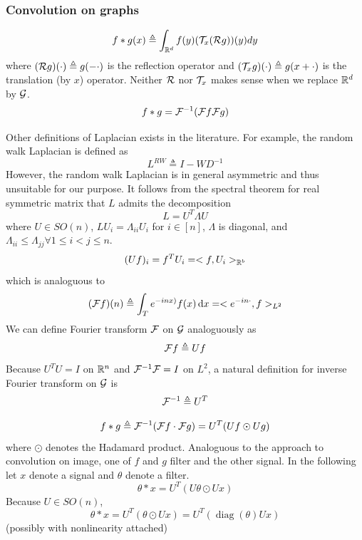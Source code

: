 \documentclass{article}
\DeclareMathOperator{\diag}{diag}
\begin{document}
\subsubsection{Convolution on graphs}

\begin{equation*}
f * g (x) \triangleq \int_{{\mathbb R}^d} f(y) ({\mathcal T}_x ({\mathcal R} g)) (y) dy
\end{equation*}
where $({\mathcal R} g) (\cdot) \triangleq g(-\cdot)$ is the reflection operator and $({\mathcal T}_x g) (\cdot) \triangleq g(x + \cdot)$ is the translation (by $x$) operator.
Neither ${\mathcal R}$ nor ${\mathcal T}_x$ makes sense when we replace ${\mathbb R}^d$ by ${\mathcal G}$.
\begin{equation*}
f * g = {\mathcal F}^{-1} ({\mathcal F}  f {\mathcal F} g)
\end{equation*}

Other definitions of Laplacian exists in the literature.
For example, the random walk Laplacian is defined as
\[
L^{RW} \triangleq I - W D^{-1}
\]
However, the random walk Laplacian is in general asymmetric and thus unsuitable for our purpose.
It follows from the spectral theorem for real symmetric matrix that $L$ admits the decomposition
\begin{equation*}
L = U^T \Lambda U
\end{equation*}
where $U \in SO(n)$, $L U_i = \Lambda_{i i} U_i$ for $i \in [n]$, $\Lambda$ is diagonal, and $\Lambda_{i i} \leq \Lambda_{j j} \forall 1 \leq i < j \leq n$.
\begin{equation*}
(U f)_i
= f^T U_i
= <f, U_i>_{{\mathbb R}^b}
\end{equation*}
which is analoguous to
\begin{equation*}
(\calf f) (n)
\triangleq \int_T e^{-i n x)} f(x) \dif x
= <e^{-i n \cdot}, f>_{L^2}
\end{equation*}
We can define Fourier transform ${\mathcal F}$ on ${\mathcal G}$ analoguously as
\begin{equation*}
{\mathcal F} f \triangleq U f
\end{equation*}
Because $U^T U = I$ on ${\mathbb R}^n$ and ${\mathcal F}^{-1} {\mathcal F} = I$ on $L^2$, a natural definition for inverse Fourier transform on ${\mathcal G}$ is
\begin{equation*}
{\mathcal F}^{-1} \triangleq U^T
\end{equation*}

\begin{equation*}
f * g
\triangleq {\mathcal F}^{-1} ({\mathcal F} f \cdot {\mathcal F} g)
= U^T (U f \odot U g)
\end{equation*}
where $\odot$ denotes the Hadamard product.
Analoguous to the approach to convolution on image, one of $f$ and $g$ filter and the other signal.
In the following let $x$ denote a signal and $\theta$ denote a filter.
\[
\theta * x
= U^T (U \theta \odot U x)
\]
Because $U \in SO(n)$,
\[
\theta * x
= U^T (\theta \odot U x)
= U^T (\diag (\theta) U x)
\]
(possibly with nonlinearity attached)
\end{document}
